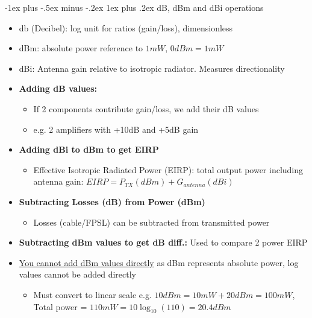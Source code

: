 \documentclass[10pt,landscape]{article}
\makeatletter
\newcommand{\subsubsubsection}{\@startsection{subsubsection}{3}{0mm}%
                                {-1ex plus -.5ex minus -.2ex}%
                                {1ex plus .2ex}%
                                {\normalfont\scriptsize\bfseries}}
\newcommand{\1}{\mathmybb{1}}
\makeatother
\begin{document}
\begin{multicols*}{3}
\subsubsubsection{dB, dBm and dBi operations}
\begin{itemize}
  \item db (Decibel): log unit for ratios (gain/loss), dimensionless
  \item dBm: absolute power reference to $1mW$, $0 dBm = 1mW$
  \item dBi: Antenna gain relative to isotropic radiator. Measures directionality
  \item \textbf{Adding dB values:}
  \begin{itemize}
    \item If 2 components contribute gain/loss, we add their dB values
    \item e.g. 2 amplifiers with +10dB and +5dB gain
  \end{itemize}
  \item \textbf{Adding dBi to dBm to get EIRP}
  \begin{itemize}
    \item Effective Isotropic Radiated Power (EIRP): total output power including antenna gain: $EIRP = P_{TX}(dBm) + G_{antenna}(dBi)$
  \end{itemize}
  \item \textbf{Subtracting Losses (dB) from Power (dBm)}
  \begin{itemize}
    \item Losses (cable/FPSL) can be subtracted from transmitted power
  \end{itemize}
  \item \textbf{Subtracting dBm values to get dB diff.:} Used to compare 2 power EIRP
  \item \underline{You cannot add dBm values directly} as dBm represents absolute power, log values cannot be added directly
  \begin{itemize}
    \item Must convert to linear scale e.g. $10 dBm = 10mW + 20 dBm = 100 mW$, Total power = $110 mW = 10\log_{10}(110) = 20.4 dBm$
  \end{itemize}
\end{itemize}


\end{multicols*}
\end{document}
